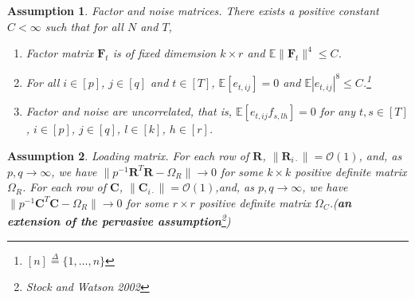 \documentclass{article}[12pt]
\newtheorem{assumption}{Assumption}
\begin{document}
\begin{assumption}\label{assumption 2 1.7.1}
    Factor and noise matrices. \normalfont There exists a positive constant $C < \infty$ such that for all $N$ and $T$,
    \begin{enumerate}
        \item Factor matrix $\mathbf{F}_t$ is of fixed dimemsion $k \times r$ and $\mathbb{E}\lVert\mathbf{F}_t\rVert^4\leq C $.
        \item For all $i \in \left[p\right]$, $j \in \left[q\right]$ and $t \in \left[T\right]$, $\mathbb{E}\left[e_{t,ij}\right]=0$ and $\mathbb{E}|e_{t,ij}|^8 \leq C$.\footnote{$\left[n\right] \overset{\Delta}{=} \{1,\dots,n\}$}
        \item Factor and noise are uncorrelated, that is, $\mathbb{E}\left[e_{t,ij}f_{s,lh}\right]=0$ for any $t,s \in \left[T\right]$, $i \in \left[p\right]$, $j \in \left[q\right]$, $l \in \left[k\right]$, $h \in \left[r\right]$.
    \end{enumerate}
\end{assumption}

\begin{assumption}\label{assumption 3 1.7.1}
    Loading matrix. \normalfont For each row of $\mathbf{R}$, $\lVert\mathbf{R}_{i\cdot}\rVert = \mathcal{O}(1)$, and, as $p,q \rightarrow \infty$, we have $\lVert p^{-1}\mathbf{R}^T\mathbf{R}-\Omega_R\rVert \rightarrow 0$ for some $k \times k$ positive definite matrix $\Omega_R$. For each row of $\mathbf{C}$, $\lVert\mathbf{C}_{i\cdot}\rVert = \mathcal{O}(1)$,and, as $p,q \rightarrow \infty$, we have $\lVert p^{-1}\mathbf{C}^T\mathbf{C}-\Omega_R\rVert \rightarrow 0$ for some $r \times r$ positive definite matrix $\Omega_C$.(\textbf{\textit{an extension of the pervasive assumption}}\footnote{Stock and Watson 2002})
\end{assumption}
\end{document}
